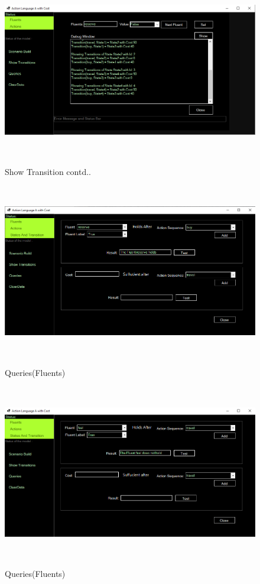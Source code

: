 \documentclass[11pt]{article}
\begin{document}
		\begin{figure}[H]
		\centering
		\includegraphics[width=6in,height=3in]{./testImages/Example1/img6.png}
		\label{Figure:f01.6}
		\caption{Show Transition contd..}
	\end{figure}
		\begin{figure}[H]
		\centering
		\includegraphics[width=6in,height=3in]{./testImages/Example1/img7.png}
		\label{Figure:f01.7}
		\caption{Queries(Fluents)}
	\end{figure}
	\begin{figure}[H]
		\centering
		\includegraphics[width=6in,height=3in]{./testImages/Example1/img8.png}
		\label{Figure:f01.8}
		\caption{Queries(Fluents)}
	\end{figure}
\end{document}
